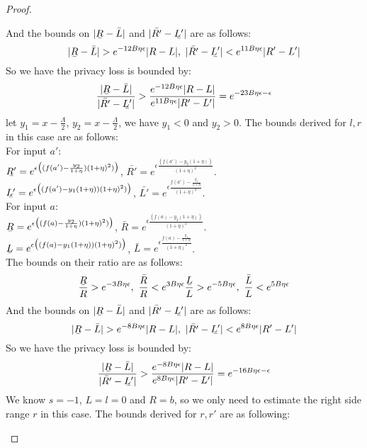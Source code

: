 \documentclass[a4paper,11pt]{article}
\begin{document}
\begin{proof}
\begin{itemize}
\[		\]
		And the bounds on $|\ubar{R} - \bar{L}|$ and $|\bar{R'} - \ubar{L'}|$ are as follows:
		\[
		|\ubar{R} - \bar{L}| > e^{-12 B\eta \epsilon}|R - L|, 
		~ |\bar{R'} - \ubar{L'}| < e^{11 B\eta \epsilon}|R' - L'|
		\]
		So we have the privacy loss is bounded by:
		\[
		\frac{|\ubar{R} - \bar{L}|}{|\bar{R'} - \ubar{L'}|}
		> \frac{e^{-12 B\eta \epsilon}|R - L|}{e^{11 B\eta \epsilon}|R' - L'|}
		= e^{-23B \eta \epsilon - \epsilon}
		\]
		let $y_1 = x - \frac{\Lambda}{2}$, $y_2 = x - \frac{\Lambda}{2}$, we have $y_1 < 0$ and $y_2 > 0$. The bounds derived for $l, r$ in this case are as follows:
		\\
		For input $a'$:
		\\
		$\ubar{R'} = e^{\epsilon 
				\big( (f(a') - \frac{y_2}{1 + \eta}) (1 + \eta)^2) \big)}$, 
		$\bar{R'} = e^{\epsilon 
				\frac{(f(a') - y_2(1 + \eta))}{(1 + \eta)^2}}$.
		\\
		$\ubar{L'} = e^{\epsilon 
				\big( (f(a') - y_1(1 + \eta)) (1 + \eta)^2) \big)}$, 
		$\bar{L'} = e^{\epsilon 
				\frac{f(a') - \frac{y_1}{1 + \eta}}{(1 + \eta)^2}}$.
		\\
		For input $a$:
		\\
		$\ubar{R} = e^{\epsilon 
				\big( (f(a) - \frac{y_2}{1 + \eta}) (1 + \eta)^2) \big)}$, 
		$\bar{R} = e^{\epsilon 
				\frac{(f(a) - y_2(1 + \eta))}{(1 + \eta)^2}}$.  
		\\
		$\ubar{L} = e^{\epsilon 
				\big( (f(a) - y_1(1 + \eta)) (1 + \eta)^2) \big)}$, 
		$\bar{L} = e^{\epsilon 
				\frac{f(a) - \frac{y_1}{1 + \eta}}{(1 + \eta)^2}}$.
		\\
		The bounds on their ratio are as follows:
		\[
		\frac{\ubar{R}}{R} > e^{-3B\eta \epsilon}, 
		~ \frac{\bar{R}}{R} < e^{3B\eta \epsilon}
		\frac{\ubar{L}}{L} > e^{-5B\eta \epsilon}, 
		~ \frac{\bar{L}}{L} < e^{5B\eta \epsilon}
		\]
		And the bounds on $|\ubar{R} - \bar{L}|$ and $|\bar{R'} - \ubar{L'}|$ are as follows:
		\[
		|\ubar{R} - \bar{L}| > e^{-8 B\eta \epsilon}|R - L|, 
		~ |\bar{R'} - \ubar{L'}| < e^{8 B\eta \epsilon}|R' - L'|
		\]
		So we have the privacy loss is bounded by:
		\[
		\frac{|\ubar{R} - \bar{L}|}{|\bar{R'} - \ubar{L'}|}
		> \frac{e^{-8 B\eta \epsilon}|R - L|}{e^{8 B\eta \epsilon}|R' - L'|}
		= e^{-16B \eta \epsilon - \epsilon}
		\]
		We know $s = -1$, $L = l = 0$ and $R = b$, so we only need to estimate the right side range $r$ in this case. The bounds derived for $r, r'$ are as following:

\end{itemize}
\end{proof}
\end{document}
